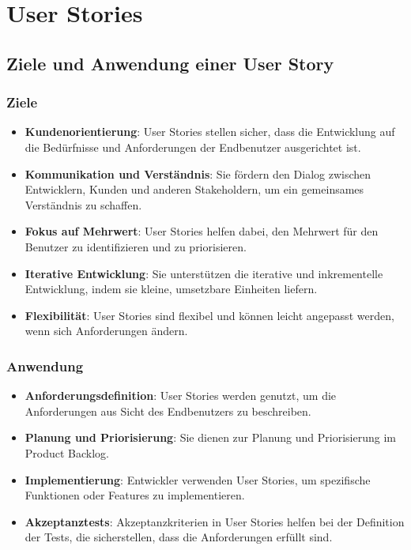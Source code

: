 \section{User Stories}

\subsection{Ziele und Anwendung einer User Story}

\subsubsection{Ziele}

\begin{itemize}
    \item \textbf{Kundenorientierung}: User Stories stellen sicher, dass die Entwicklung auf die Bedürfnisse und Anforderungen der Endbenutzer ausgerichtet ist.
    \item \textbf{Kommunikation und Verständnis}: Sie fördern den Dialog zwischen Entwicklern, Kunden und anderen Stakeholdern, um ein gemeinsames Verständnis zu schaffen.
    \item \textbf{Fokus auf Mehrwert}: User Stories helfen dabei, den Mehrwert für den Benutzer zu identifizieren und zu priorisieren.
    \item \textbf{Iterative Entwicklung}: Sie unterstützen die iterative und inkrementelle Entwicklung, indem sie kleine, umsetzbare Einheiten liefern.
    \item \textbf{Flexibilität}: User Stories sind flexibel und können leicht angepasst werden, wenn sich Anforderungen ändern.
\end{itemize}

\subsubsection{Anwendung}

\begin{itemize}
    \item \textbf{Anforderungsdefinition}: User Stories werden genutzt, um die Anforderungen aus Sicht des Endbenutzers zu beschreiben.
    \item \textbf{Planung und Priorisierung}: Sie dienen zur Planung und Priorisierung im Product Backlog.
    \item \textbf{Implementierung}: Entwickler verwenden User Stories, um spezifische Funktionen oder Features zu implementieren.
    \item \textbf{Akzeptanztests}: Akzeptanzkriterien in User Stories helfen bei der Definition der Tests, die sicherstellen, dass die Anforderungen erfüllt sind.
\end{itemize}

